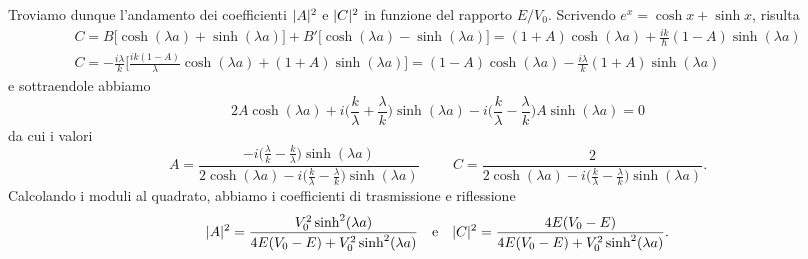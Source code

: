 Troviamo dunque l'andamento dei coefficienti $\lvert A\rvert^2$ e $\lvert C\rvert^2$ in funzione del rapporto $E/V_0$.
Scrivendo $e^x=\cosh x+\sinh x$, risulta
\begin{equation}
	\begin{gathered}
		C=B\big[\cosh(\lambda a)+\sinh(\lambda a)\big]+B'\big[\cosh(\lambda a)-\sinh(\lambda a)\big]=(1+A)\cosh(\lambda a)+\frac{ik}{\hbar}(1-A)\sinh(\lambda a)\\
		C=-\frac{i\lambda}{k}\bigg[\frac{ik(1-A)}{\lambda}\cosh(\lambda a)+(1+A)\sinh(\lambda a)\bigg]=(1-A)\cosh(\lambda a)-\frac{i\lambda}{k}(1+A)\sinh(\lambda a)
	\end{gathered}
\end{equation}
e sottraendole abbiamo
\begin{equation}
	2A\cosh(\lambda a)+i\bigg(\frac{k}{\lambda}+\frac{\lambda}{k}\bigg)\sinh(\lambda a)-i\bigg(\frac{k}{\lambda}-\frac{\lambda}{k}\bigg)A\sinh(\lambda a)=0
\end{equation}
da cui i valori
\begin{equation}
	A=\frac{-i\Big(\frac{\lambda}{k}-\frac{k}{\lambda}\Big)\sinh(\lambda a)}{2\cosh(\lambda a)-i\Big(\frac{k}{\lambda}-\frac{\lambda}{k}\Big)\sinh(\lambda a)}
	\hspace{1cm}
	C=\frac{2}{2\cosh(\lambda a)-i\Big(\frac{k}{\lambda}-\frac{\lambda}{k}\Big)\sinh(\lambda a)}.
\end{equation}
Calcolando i moduli al quadrato, abbiamo i coefficienti di trasmissione e riflessione
\begin{equation}
	\lvert A\rvert^2=\frac{V_0^2\sinh^2(\lambda a)}{4E(V_0-E)+V_0^2\sinh^2(\lambda a)}\quad\text{e}\quad\lvert C\rvert^2=\frac{4E(V_0-E)}{4E(V_0-E)+V_0^2\sinh^2(\lambda a)}.
	\label{eq:coefficienti-trasmissione-riflessione-tunneling}
\end{equation}

